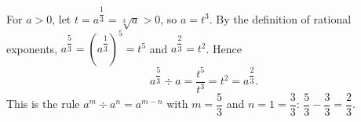 For $a>0$, let $t=a^{\dfrac13}=\sqrt[3]{a}>0$, so $a=t^3$. By the definition of rational exponents, $a^{\dfrac53}=\left(a^{\dfrac13}\right)^5=t^5$ and $a^{\dfrac23}=t^2$. Hence
\[a^{\dfrac53}\div a=\dfrac{t^5}{t^3}=t^2=a^{\dfrac23}.\]
This is the rule $a^m\div a^n=a^{m-n}$ with $m=\dfrac53$ and $n=1=\dfrac33$: $\dfrac53-\dfrac33=\boxed{\dfrac23}$.
